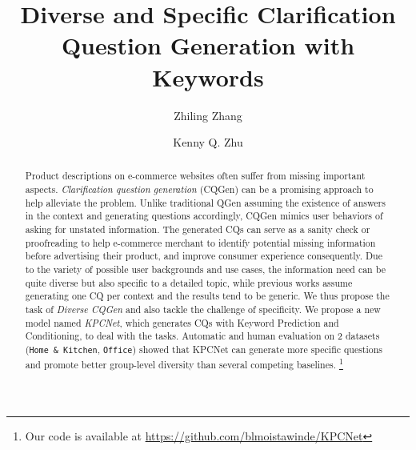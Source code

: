 \documentclass[sigconf]{acmart}
\begin{document}
\title{Diverse and Specific Clarification Question Generation with Keywords}


\author{Zhiling Zhang}

\author{Kenny Q. Zhu}

\begin{abstract}
  Product descriptions on e-commerce websites often suffer from 
missing important aspects. \textit{Clarification question generation} (CQGen) can be a promising approach to help alleviate the problem. Unlike traditional QGen assuming the existence of answers in the context and generating questions accordingly, CQGen mimics user behaviors of asking for unstated information. The generated CQs can serve as a sanity check or proofreading to help e-commerce 
merchant to identify potential missing information before advertising their
product, and improve consumer experience consequently. 
Due to the variety of possible user backgrounds and use cases, 
the information need can be quite diverse but also specific to a detailed
topic, while previous works assume generating one CQ per context and 
the results tend to be generic. We thus propose the task 
of \textit{Diverse CQGen} and also tackle the challenge of specificity. 
We propose a new model named \textit{KPCNet}, which generates CQs with 
Keyword Prediction and Conditioning, to deal with the tasks. 
Automatic and human evaluation on 2 datasets (\texttt{Home \& Kitchen}, 
\texttt{Office}) showed that KPCNet can generate more specific questions 
and promote better group-level diversity than several competing baselines. \footnote{Our code is available at \url{https://github.com/blmoistawinde/KPCNet}}
\end{abstract}
\end{document}
